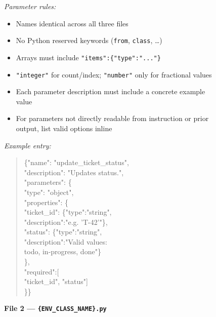 \begin{figure}[p]
\begin{tcolorbox}[
    enhanced,
    colback=gray!5,
    colframe=black!60,
    arc=2pt,
    boxrule=0.5pt,
    width=\linewidth,
    left=6pt, right=6pt, top=2pt, bottom=4pt,
    parbox=false,
]
\begin{minipage}[t]{0.303\linewidth}
\vspace{2pt}
\textit{Parameter rules:}
\begin{itemize}[nosep,leftmargin=1em,topsep=1pt,itemsep=0pt]
  \item Names identical across all three files
  \item No Python reserved keywords (\texttt{from}, \texttt{class}, \ldots)
  \item Arrays must include \texttt{"items":\{"type":"..."\}}
  \item \texttt{"integer"} for count/index; \texttt{"number"} only for fractional values
  \item Each parameter description must include a concrete example value
  \item For parameters not directly readable from instruction or prior output, list valid options inline
\end{itemize}

\vspace{2pt}
\textit{Example entry:}
\begin{quote}\ttfamily\scriptsize\vspace{-2pt}
\{"name": "update\_ticket\_status",\\
\phantom{x}"description": "Updates status.",\\
\phantom{x}"parameters": \{\\
\phantom{xx}"type": "object",\\
\phantom{xx}"properties": \{\\
\phantom{xxx}"ticket\_id": \{"type":"string",\\
\phantom{xxxx}"description":"e.g. 'T-42'"\},\\
\phantom{xxx}"status": \{"type":"string",\\
\phantom{xxxx}"description":"Valid values:\\
\phantom{xxxxxx}todo, in-progress, done"\}\\
\phantom{xx}\},\\
\phantom{xx}"required":[\\
\phantom{xxx}"ticket\_id", "status"]\\
\phantom{x}\}\}
\end{quote}

\end{minipage}%
\hfill%
\begin{minipage}[t]{0.303\linewidth}\vspace{0pt}

\textbf{File 2 — \texttt{\{ENV\_CLASS\_NAME\}.py}}


\end{minipage}
\end{tcolorbox}
\end{figure}
